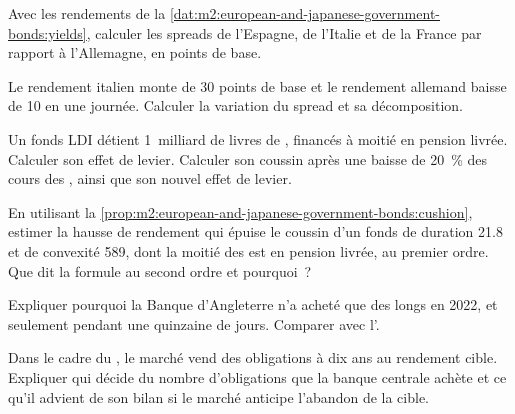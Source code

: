 \begin{exercise}[$\star$]\label{exo:m2:european-and-japanese-government-bonds:1}
Avec les rendements de la \cref{dat:m2:european-and-japanese-government-bonds:yields},
calculer les spreads de l'Espagne, de l'Italie et de la France par rapport à l'Allemagne, en points de base.
\end{exercise}

\begin{exercise}[$\star$]\label{exo:m2:european-and-japanese-government-bonds:2}
Le rendement italien monte de 30 points de base et le rendement allemand baisse de 10 en une journée. Calculer
la variation du spread et sa décomposition.
\end{exercise}

\begin{exercise}[$\star$]\label{exo:m2:european-and-japanese-government-bonds:3}
Un fonds LDI détient 1~milliard de livres de , financés à moitié en pension livrée. Calculer son
effet de levier. Calculer son coussin après une baisse de 20~\% des cours des , ainsi que son nouvel
effet de levier.
\end{exercise}

\begin{exercise}[$\star\star$]\label{exo:m2:european-and-japanese-government-bonds:4}
En utilisant la \cref{prop:m2:european-and-japanese-government-bonds:cushion}, estimer la
hausse de rendement qui épuise le coussin d'un fonds de duration 21.8 et de convexité 589,
dont la moitié des  est en pension livrée, au premier ordre. Que dit la formule au second ordre
et pourquoi~?
\end{exercise}

\begin{exercise}[$\star\star$]\label{exo:m2:european-and-japanese-government-bonds:5}
Expliquer pourquoi la Banque d'Angleterre n'a acheté que des  longs en 2022, et seulement
pendant une quinzaine de jours. Comparer avec l'.
\end{exercise}

\begin{exercise}[$\star\star$]\label{exo:m2:european-and-japanese-government-bonds:6}
Dans le cadre du , le marché vend des obligations à dix ans
au rendement cible. Expliquer qui décide du nombre d'obligations que la banque centrale achète
et ce qu'il advient de son bilan si le marché anticipe l'abandon de la cible.
\end{exercise}

